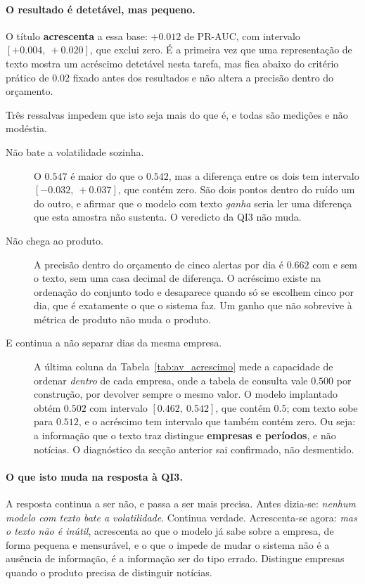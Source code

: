 \paragraph{O resultado é detetável, mas pequeno.} O título \textbf{acrescenta} a essa base:
$+0.012$ de PR-AUC, com intervalo $[+0.004,\ +0.020]$, que exclui zero. É a primeira vez que uma
representação de texto mostra um acréscimo detetável nesta tarefa, mas fica abaixo do critério
prático de $0.02$ fixado antes dos resultados e não altera a precisão dentro do orçamento.

Três ressalvas impedem que isto seja mais do que é, e todas são medições e não modéstia.

\begin{description}
  \item[Não bate a volatilidade sozinha.] O $0.547$ é maior do que o $0.542$, mas a diferença
        entre os dois tem intervalo $[-0.032,\ +0.037]$, que contém zero. São dois pontos dentro
        do ruído um do outro, e afirmar que o modelo com texto \emph{ganha} seria ler uma
        diferença que esta amostra não sustenta. O veredicto da \gls{QI}3 não muda.

  \item[Não chega ao produto.] A precisão dentro do orçamento de cinco alertas por dia é
        $0.662$ com e sem o texto, sem uma casa decimal de diferença. O acréscimo existe na
        ordenação do conjunto todo e desaparece quando só se escolhem cinco por dia, que é
        exatamente o que o sistema faz. Um ganho que não sobrevive à métrica de produto não muda
        o produto.

  \item[E continua a não separar dias da mesma empresa.] A última coluna da
        Tabela~\ref{tab:av_acrescimo} mede a capacidade de ordenar \emph{dentro} de cada empresa,
        onde a tabela de consulta vale $0.500$ por construção, por devolver sempre o mesmo valor.
        O modelo implantado obtém $0.502$ com intervalo $[0.462,\ 0.542]$, que contém $0.5$; com
        texto sobe para $0.512$, e o acréscimo tem intervalo que também contém zero. Ou seja: a
        informação que o texto traz distingue \textbf{empresas e períodos}, e não notícias. O
        diagnóstico da secção anterior sai confirmado, não desmentido.
\end{description}

\paragraph{O que isto muda na resposta à \gls{QI}3.} A resposta continua a ser não, e passa a ser
mais precisa. Antes dizia-se: \emph{nenhum modelo com texto bate a volatilidade}. Continua
verdade. Acrescenta-se agora: \emph{mas o texto não é inútil}, acrescenta ao que o modelo já sabe
sobre a empresa, de forma pequena e mensurável, e o que o impede de mudar o sistema não é a
ausência de informação, é a informação ser do tipo errado. Distingue empresas quando o produto precisa de
distinguir notícias.

